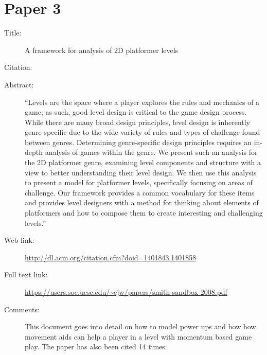 \documentclass{scrartcl}
\begin{document}
\section*{Paper 3}
\begin{description}
\item[Title:] A framework for analysis of 2D platformer levels
\item[Citation:] \cite{Smith}
\item[Abstract:] ``Levels are the space where a player explores the rules and mechanics of a game; as such, good level design is critical to the game design process. While there are many broad design principles, level design is inherently genre-specific due to the wide variety of rules and types of challenge found between genres. Determining genre-specific design principles requires an in-depth analysis of games within the genre. We present such an analysis for the 2D platformer genre, examining level components and structure with a view to better understanding their level design. We then use this analysis to present a model for platformer levels, specifically focusing on areas of challenge. Our framework provides a common vocabulary for these items and provides level designers with a method for thinking about elements of platformers and how to compose them to create interesting and challenging levels.''
\item[Web link:] \url{http://dl.acm.org/citation.cfm?doid=1401843.1401858}
\item[Full text link:] \url{https://users.soe.ucsc.edu/~ejw/papers/smith-sandbox-2008.pdf}
\item[Comments:] This document goes into detail on how to model power ups and how how movement aids can help a player in a level with momentum based game play. The paper has also been cited 14 times.
\end{description}
\end{document}
